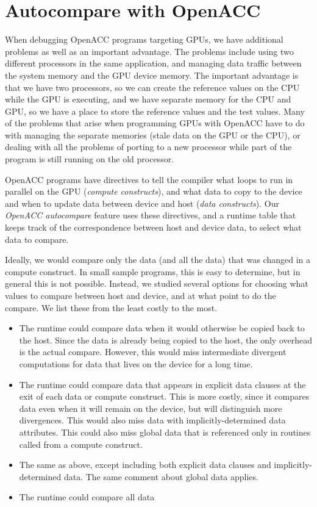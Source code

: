 \section{Autocompare with OpenACC}

When debugging OpenACC programs targeting GPUs, we have additional problems as well as an important advantage.
The problems include using two different processors in the same application, and managing data traffic between the system memory and the GPU device memory.
The important advantage is that we have two processors, so we can create the reference values on the CPU while the GPU is executing, and we have separate memory for the CPU and GPU, so we have a place to store the reference values and the test values.
Many of the problems that arise when programming GPUs with OpenACC have to do with managing the separate memories (stale data on the GPU or the CPU), or dealing with all the problems of porting to a new processor while part of the program is still running on the old processor.

OpenACC programs have directives to tell the compiler what loops to run in parallel on the GPU (\emph{compute constructs}), and what data to copy to the device and when to update data between device and host (\emph{data constructs}).
Our \emph{OpenACC autocompare} feature uses these directives, and a runtime table that keeps track of the correspondence between host and device data, to select what data to compare.

Ideally, we would compare only the data (and all the data) that was changed in a compute construct.
In small sample programs, this is easy to determine, but in general this is not possible.
Instead, we studied several options for choosing what values to compare between host and device, and at what point to do the compare.
We list these from the least costly to the most.
\begin{itemize}
\item The runtime could compare data when it would otherwise be copied back to the host.
Since the data is already being copied to the host, the only overhead is the actual compare.
However, this would miss intermediate divergent computations for data that lives on the device for a long time.
\item The runtime could compare data that appears in explicit data clauses at the exit of each data or compute construct.
This is more costly, since it compares data even when it will remain on the device, but will distinguish more divergences.
This would also miss data with implicitly-determined data attributes.
This could also miss global data that is referenced only in routines called from a compute construct.
\item The same as above, except including both explicit data clauses and implicitly-determined data.
The same comment about global data applies.
\item The runtime could compare all data 
\end{itemize}


